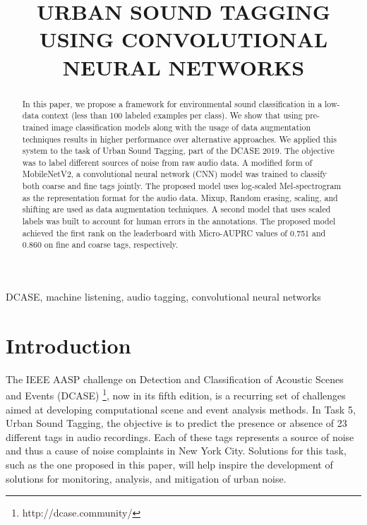 \documentclass{article}
\title{URBAN SOUND TAGGING USING CONVOLUTIONAL NEURAL NETWORKS}
\begin{document}
\ninept
\maketitle

\begin{sloppy}

\begin{abstract}
In this paper, we propose a framework for environmental sound classification in a low-data context (less than 100 labeled examples per class). We show that using pre-trained image classification models along with the usage of data augmentation techniques results in higher performance over alternative approaches. We applied this system to the task of Urban Sound Tagging, part of the DCASE 2019. The objective was to label different sources of noise from raw audio data. A modified form of MobileNetV2, a convolutional neural network (CNN) model was trained to classify both coarse and fine tags jointly. The proposed model uses log-scaled Mel-spectrogram as the representation format for the audio data. Mixup, Random erasing, scaling, and shifting are used as data augmentation techniques. A second model that uses scaled labels was built to account for human errors in the annotations. The proposed model achieved the first rank on the leaderboard with Micro-AUPRC values of 0.751 and 0.860 on fine and coarse tags, respectively.
\end{abstract}

\begin{keywords}
DCASE, machine listening, audio tagging, convolutional neural networks
\end{keywords}


\section{Introduction}
\label{sec:intro}

The IEEE AASP challenge on Detection and Classification of Acoustic Scenes and Events (DCASE) \footnote{http://dcase.community/}, now in its fifth edition, is a recurring set of challenges aimed at developing computational scene and event analysis methods. In Task 5, Urban Sound Tagging, the objective is to predict the presence or absence of 23 different tags in audio recordings. Each of these tags represents a source of noise and thus a cause of noise complaints in New York City. Solutions for this task, such as the one proposed in this paper, will help inspire the development of solutions for monitoring, analysis, and mitigation of urban noise.


\end{sloppy}
\end{document}
